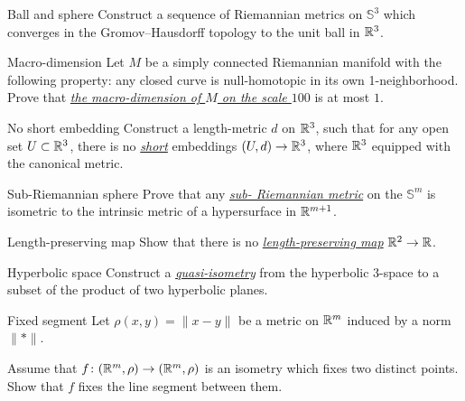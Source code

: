 \documentclass[twoside]{book}
\begin{document}
\begin{pr}{}{Ball and sphere}\label{3-sphere is close to a ball}
Construct a sequence of Riemannian metrics on $\mathbb{S}^3$ 
which converges in the Gromov--Hausdorff topology 
to the unit ball in $\mathbb{R}^3$.
\end{pr}

\begin{pr}{\easy}{Macro-dimension}\label{macro-dimension} 
Let $M$ be a simply connected Riemannian manifold with the following property: 
any closed curve is null-homotopic 
in its own  1-neighborhood. 
Prove that \hyperref[Macro-dimension]{\emph{the macro-dimension of $M$ on the scale $100$}} is at most $1$.
\end{pr}


{\begin{pr}{\hard}{No short embedding}\label{weird-metric} 
Construct a length-metric $d$ on $\mathbb{R}^3$,
such that for any open set $U\subset  \mathbb{R}^3$,
there is no \hyperref[Short map]{\emph{short}} embeddings $(U,d)\to \mathbb{R}^3$,
where $\mathbb{R}^3$ equipped with the canonical metric.
\end{pr}

\begin{pr}{\thm}{Sub-Riemannian sphere}\label{sub-Riemannian} 
Prove that any \hyperref[Sub-Riemannian metric]{\emph{sub-\hskip0mm Riemannian metric}} 
on the $\mathbb{S}^m$ is isometric to the intrinsic metric of a hypersurface in $\mathbb{R}^{m+1}$.
\end{pr}

\begin{pr}{\thm}{Length-preserving map}\label{two2one} 
Show that there is no \hyperref[Length-preserving map]{\emph{length-preserving map}} $\mathbb{R}^2\to \mathbb{R}$.
\end{pr}



\begin{pr}{}{Hyperbolic space}\label{Hyperbolic space}
Construct a \hyperref[Quasi-isometry]{\emph{quasi-isometry}}
from the hyperbolic $3$-space 
to a subset 
of the product of two hyperbolic planes.
\end{pr}

\begin{pr}{}{Fixed segment}\label{Fixed segment}
Let $\rho(x,y)=\|x-y\|$ be a metric on $\mathbb{R}^m$ induced by a norm $\|{*}\|$.

Assume that $f\colon(\mathbb{R}^m,\rho)\to(\mathbb{R}^m,\rho)$ is an isometry which fixes two distinct points.
Show that $f$ fixes the line segment between them.
\end{pr}

}
\end{document}
